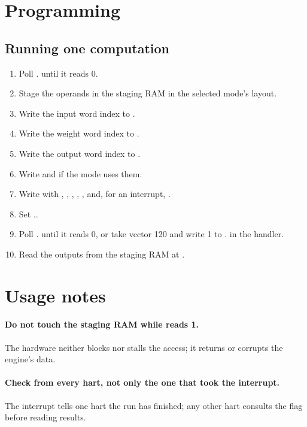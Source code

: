 \section{Programming}

\subsection{Running one computation}

\begin{enumerate}
	\item Poll . until it reads 0.
	\item Stage the operands in the staging RAM in the selected mode's layout.
	\item Write the input word index to .
	\item Write the weight word index to .
	\item Write the output word index to .
	\item Write  and  if the mode uses them.
	\item Write  with , , , , ,  and, for an interrupt, .
	\item Set ..
	\item Poll . until it reads 0, or take vector 120 and write 1 to . in the handler.
	\item Read the outputs from the staging RAM at .
\end{enumerate}

\section{Usage notes}

\paragraph{Do not touch the staging RAM while  reads 1.} The hardware neither blocks nor stalls the access; it returns or corrupts the engine's data.

\paragraph{Check  from every hart, not only the one that took the interrupt.} The interrupt tells one hart the run has finished; any other hart consults the flag before reading results.

